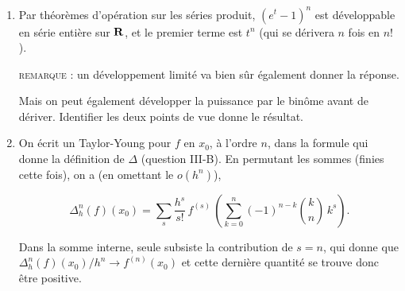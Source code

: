 \documentclass[a4paper]{article}
\begin{document}
\begin{enumerate}
\begin{enumerate}
	Je comprends qu'il faut supposer $f$ positive (mais la moiti\'e de la
question pos\'ee s'\'evapore alors), et je me donne $a<\alpha<\beta<b$, je
choisis $h=(\beta-\alpha)/K$ avec $K$ entier assez grand pour que
$h<b-\beta$. Alors $]a,b-h[\supset ]a,\beta[$ et je peux joindre
$\alpha$ \`a $\beta$ par des petits pas d'amplitude $h$, avec \`a chaque
fois $0\le f(\alpha_i+h)-f(\alpha_i)$. On ajoute ces in\'egalit\'es pour
conclure.

\item

	Par th\'eor\`emes d'op\'eration sur les s\'eries produit, $(e^t-1)^n$ est
d\'eveloppable en s\'erie enti\`ere sur $\mathbf{R}$, et le premier terme est
$t^n$ (qui se d\'erivera $n$ fois en $n!$).

\textsc{remarque :} un d\'eveloppement limit\'e va bien s\^ur \'egalement
donner la r\'eponse.


	Mais on peut \'egalement d\'evelopper la puissance par le bin\^ome avant
de d\'eriver. Identifier les deux points de vue donne le r\'esultat.

\item

	On \'ecrit un Taylor-Young pour $f$ en $x_0$, \`a l'ordre $n$, dans la
formule qui donne la d\'efinition de $\Delta$ (question III-B). En
permutant les sommes (finies cette fois), on a (en omettant le
$o(h^n)$),

	$$\Delta_h^n(f)(x_0)=\sum_s \frac{h^s}{s!}\,f^{(s)}\,\left(\sum_{k=0}^n
(-1)^{n-k}{k \choose n}\, k^s\right).$$

	Dans la somme interne, seule subsiste la contribution de $s=n$, qui
donne que $\Delta_h^n(f)(x_0)/h^n\to f^{(n)}(x_0)$ et cette derni\`ere
quantit\'e se trouve donc \^etre positive.

\end{enumerate}




\end{enumerate} %

\end{document}
